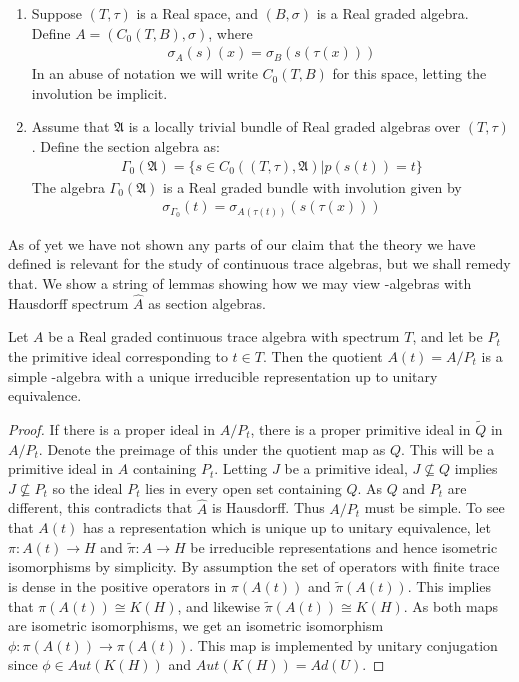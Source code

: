 \begin{definition}
\begin{enumerate}
	\item
		Suppose $(T,\tau)$ is a Real space, and $(B,\sigma)$ is a Real graded \Cstar algebra. Define $A=(C_0(T,B),\sigma)$, where  
		\begin{align*}
			\sigma_A(s)(x)=\sigma_B(s(\tau(x)))
		\end{align*}
		In an abuse of notation we will write $C_0(T,B)$ for this space, letting the involution be implicit. 
	\item
		Assume that $\mathfrak{A}$ is a locally trivial bundle of Real graded \Cstar algebras over $(T,\tau)$. Define the section algebra as:
		\begin{align*}
			\Gamma_0(\mathfrak{A})=\{s\in C_0((T,\tau),\mathfrak{A}) | p(s(t))=t\}
		\end{align*}
		The algebra $\Gamma_0(\mathfrak{A})$ is a Real graded \Cstar bundle with involution given by 
		\begin{align*}
			\sigma_{\Gamma_0}(t)=\sigma_{A(\tau(t))}(s(\tau(x)))
		\end{align*}
\end{enumerate}
\end{definition}
As of yet we have not shown any parts of our claim that the theory we have defined is relevant for the study of continuous trace algebras, but we shall remedy that. We show a string of lemmas showing how we may view \Cstar-algebras with Hausdorff spectrum $\hat{A}$ as section algebras.
\begin{lemma}
	Let $A$ be a Real graded continuous trace algebra with spectrum $T$, and let be $P_t$ the primitive ideal corresponding to $t\in T$. Then the quotient $A(t)=A/P_t$ is a simple \Cstar-algebra with a unique irreducible representation up to unitary equivalence. 
\end{lemma}
\begin{proof}
	If there is a proper ideal in $A/P_t$, there is a proper primitive ideal in $\tilde{Q}$ in $A/P_t$. Denote the preimage of this under the quotient map as $Q$. This will be a primitive ideal in $A$ containing $P_t$. Letting $J$ be a primitive ideal, $J\nsubseteq Q$ implies $J\nsubseteq P_t$ so the ideal $P_t$ lies in every open set containing $Q$. As $Q$ and $P_t$ are different, this contradicts that $\hat{A}$ is Hausdorff. Thus $A/P_t$ must be simple. 
	To see that $A(t)$ has a representation which is unique up to unitary equivalence, let $\pi:A(t)\to H$ and $\tilde{\pi}:A\to H$ be irreducible representations and hence isometric isomorphisms by simplicity. By assumption the set of operators with finite trace is dense in the positive operators in $\pi(A(t))$ and $\tilde{\pi}(A(t))$. This implies that $\pi(A(t))\cong K(H)$, and likewise $\tilde{\pi}(A(t))\cong K(H)$. As both maps are isometric isomorphisms, we get an isometric isomorphism $\phi:\pi(A(t))\to \pi(A(t))$. This map is implemented by unitary conjugation since $\phi \in Aut(K(H))$ and $Aut(K(H))=Ad(U)$.
\end{proof}
